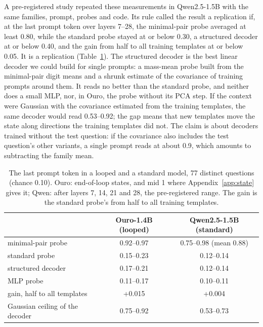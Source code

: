 \documentclass{article}
\begin{document}
A pre-registered study repeated these measurements in Qwen2.5-1.5B with the same families, prompt, probes and code. Its rule called the result a replication if, at the last prompt token over layers 7--28, the minimal-pair probe averaged at least 0.80, while the standard probe stayed at or below 0.30, a structured decoder at or below 0.40, and the gain from half to all training templates at or below 0.05. It is a replication (Table~\ref{tab:qwen}). The structured decoder is the best linear decoder we could build for single prompts: a mass-mean probe \citep{marks2023} built from the minimal-pair digit means and a shrunk estimate of the covariance of training prompts around them. It reads no better than the standard probe, and neither does a small MLP, nor, in Ouro, the probe without its PCA step. If the context were Gaussian with the covariance estimated from the training templates, the same decoder would read 0.53--0.92; the gap means that new templates move the state along directions the training templates did not. The claim is about decoders trained without the test question: if the covariance also includes the test question's other variants, a single prompt reads at about 0.9, which amounts to subtracting the family mean.

\begin{table}[t]
\centering
\caption{The last prompt token in a looped and a standard model, 77 distinct questions (chance 0.10). Ouro: end-of-loop states, and mid 1 where Appendix~\ref{app:state} gives it; Qwen: after layers 7, 14, 21 and 28, the pre-registered range. The gain is the standard probe's from half to all training templates.}
\label{tab:qwen}
\small
\begin{tabular}{@{}lcc@{}}
\toprule
 & Ouro-1.4B (looped) & Qwen2.5-1.5B (standard) \\
\midrule
minimal-pair probe & 0.92--0.97 & 0.75--0.98 (mean 0.88) \\
standard probe & 0.15--0.23 & 0.12--0.14 \\
structured decoder & 0.17--0.21 & 0.12--0.14 \\
MLP probe & 0.11--0.17 & 0.10--0.11 \\
gain, half to all templates & +0.015 & +0.004 \\
Gaussian ceiling of the decoder & 0.75--0.92 & 0.53--0.73 \\
\bottomrule
\end{tabular}
\end{table}
\end{document}

